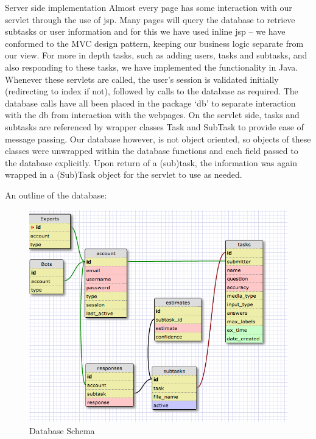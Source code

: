 \documentclass[11pt]{article}
\begin{document}
Server side implementation
Almost every page has some interaction with our servlet through the use of jsp.
Many pages will query the database to retrieve subtasks or user information and for
this we have used inline jsp -- we have conformed to the MVC design pattern, keeping
our business logic separate from our view. For more in depth tasks, such as
adding users, tasks and subtasks, and also responding
to these tasks, we have implemented the functionality in Java. Whenever these servlets
are called, the user's session is validated initially (redirecting to index if not),
followed by calls to the database as required. The database calls have all been placed
in the package `db' to separate interaction with the db from interaction with the webpages.
On the servlet side, tasks and subtasks are referenced by wrapper classes Task and SubTask
to provide ease of message passing. Our database however, is not object oriented, so
objects of these classes were unwrapped within the database functions and each field
passed to the database explicitly. Upon return of a (sub)task, the information was again
wrapped in a (Sub)Task object for the servlet to use as needed.

An outline of the database:

\begin{figure}[htbp]
\begin{center}
\includegraphics[width=\linewidth]{images/schema.png}
\caption{Database Schema}
\label{default}
\end{center}
\end{figure}
\end{document}
